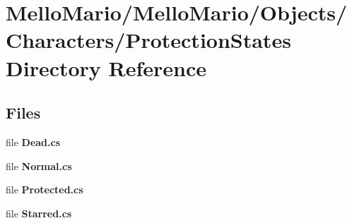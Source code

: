 \section{Mello\+Mario/\+Mello\+Mario/\+Objects/\+Characters/\+Protection\+States Directory Reference}
\label{dir_85a1281bc1e6eaa9180ad98c9884bc56}
\subsection*{Files}
\begin{DoxyCompactItemize}
\item 
file \textbf{ Dead.\+cs}
\item 
file \textbf{ Normal.\+cs}
\item 
file \textbf{ Protected.\+cs}
\item 
file \textbf{ Starred.\+cs}
\end{DoxyCompactItemize}
